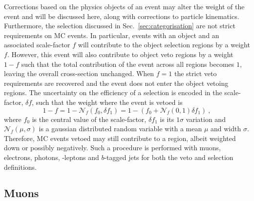 Corrections based on the physics objects of an event may alter the weight of the event and will be discussed here, along with corrections to particle kinematics. Furthermore, the selection discussed in Sec.~\ref{sec:categorisation} are not strict requirements on MC events. In particular, events with an object and an associated scale-factor $f$ will contribute to the object selection regions by a weight $f$. However, this event will also contribute to object veto regions by a weight $1-f$ such that the total contribution of the event across all regions becomes $1$, leaving the overall cross-section unchanged. When $f=1$ the strict veto requirements are recovered and the event does not enter the object vetoing regions. The uncertainty on the efficiency of a selection is encoded in the scale-factor, $\delta f$, such that the weight where the event is vetoed is
%
\begin{equation}
    1 - f = 1 - \mathcal{N}_f(f_0,\delta f_1) = 1 - (f_0 + \mathcal{N}_f(0,1)\delta f_1)\ ,
\end{equation}
%
where $f_0$ is the central value of the scale-factor, $\delta f_1$ is its $1\sigma$ variation and $\mathcal{N}_f(\mu,\sigma)$ is a gaussian distributed random variable with a mean $\mu$ and width $\sigma$. Therefore, MC events vetoed may still contribute to a region, albeit weighted down or possibly negatively. Such a procedure is performed with muons, electrons, photons, \Ptauh-leptons and $b$-tagged jets for both the veto and selection definitions.


\subsection{Muons}

